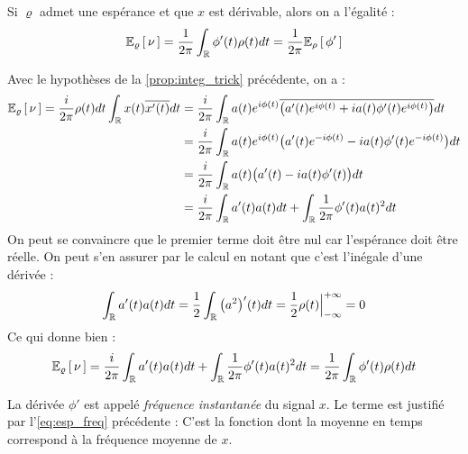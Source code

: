 \begin{proposition}\label{prop.esp_freq}
	Si $\varrho$ admet une espérance et que $x$ est dérivable, alors on a l'égalité :
	\begin{equation}\label{eq:esp_freq}
		\esp[\varrho]{\nu} = \frac{1}{2\pi}\int_\R \phi'(t)\rho(t)dt = \frac{1}{2\pi} \esp[\rho]{\phi'}
	\end{equation}
	
\begin{demo} 
	Avec le hypothèses de la \cref{prop:integ_trick} précédente, on a :
	\begin{align*}
		\esp[\varrho]{\nu} = \frac{i}{2\pi} \rho(t)dt\int_\R x(t) \congu{x'(t)} dt &= \frac{i}{2\pi}\int_\R a(t)e^{i\phi(t)}\congu{\big( a'(t)e^{i\phi(t)}+ ia(t)\phi'(t)e^{i\phi(t)} \big)} dt \\
		&= \frac{i}{2\pi}\int_\R a(t)e^{i\phi(t)}\big( a'(t)e^{-i\phi(t)} -ia(t)\phi'(t)e^{-i\phi(t)} \big) dt \\
		&= \frac{i}{2\pi}\int_\R a(t)\big( a'(t)- ia(t)\phi'(t)\big) dt \\
		&= \frac{i}{2\pi}\int_\R a'(t)a(t) dt + \int_\R  \frac{1}{2\pi}\phi'(t)a(t)^2 dt \\
	\end{align*}
	On peut se convaincre que le premier terme doit être nul car l'espérance doit être réelle. On peut s'en assurer par le calcul en notant que c'est l’inégale d'une dérivée :
	\[\int_\R a'(t)a(t) dt = \frac{1}{2} \int_\R \big(a^2\big)'(t) dt = \frac{1}{2}\rho(t)\Big|_{-\infty}^{+\infty} = 0\]
	Ce qui donne bien :
	\[\esp[\varrho]{\nu} = \frac{i}{2\pi}\int_\R a'(t)a(t) dt + \int_\R  \frac{1}{2\pi}\phi'(t)a(t)^2 dt = \frac{1}{2\pi}\int_\R \phi'(t)\rho(t) dt\]
\end{demo}
\end{proposition}

\begin{definition}
	La dérivée $\phi'$ est appelé \emph{fréquence instantanée} du signal $x$. Le terme est justifié par l'\cref{eq:esp_freq} précédente : C'est la fonction dont la moyenne en temps correspond à la fréquence moyenne de $x$.
\end{definition}

